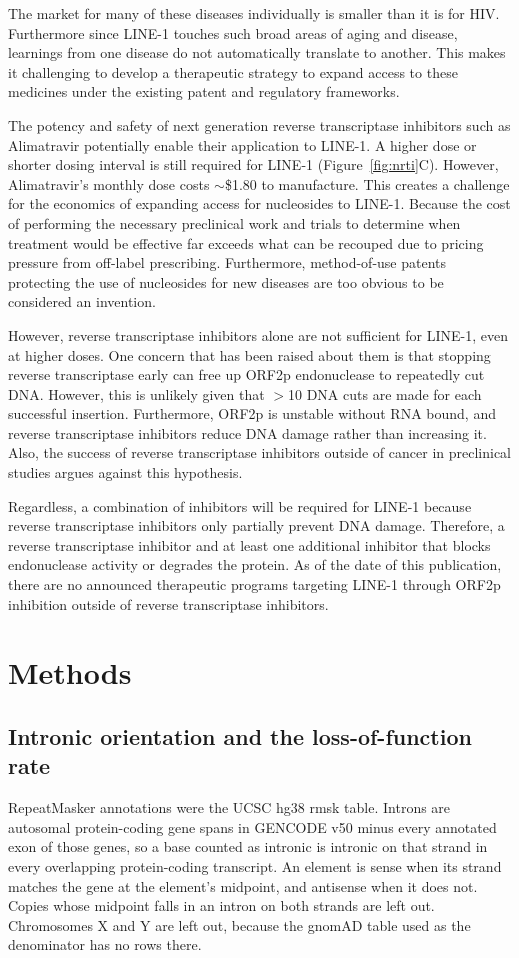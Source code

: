 \documentclass[11pt,twocolumn,twoside]{extarticle}
\begin{document}
The market for many of these diseases individually is smaller than it is for HIV. Furthermore since LINE-1 touches such broad areas of aging and disease, learnings from one disease do not automatically translate to another. This makes it challenging to develop a therapeutic strategy to expand access to these medicines under the existing patent and regulatory frameworks.

The potency and safety of next generation reverse transcriptase inhibitors such as Alimatravir potentially enable their application to LINE-1. A higher dose or shorter dosing interval is still required for LINE-1 (Figure~\ref{fig:nrti}C). However, Alimatravir's monthly dose costs $\sim$\$1.80 to manufacture. This creates a challenge for the economics of expanding access for nucleosides to LINE-1. Because the cost of performing the necessary preclinical work and trials to determine when treatment would be effective far exceeds what can be recouped due to pricing pressure from off-label prescribing. Furthermore, method-of-use patents protecting the use of nucleosides for new diseases are too obvious to be considered an invention.

However, reverse transcriptase inhibitors alone are not sufficient for LINE-1, even at higher doses. One concern that has been raised about them is that stopping reverse transcriptase early can free up ORF2p endonuclease to repeatedly cut DNA\cite{rajurkar}. However, this is unlikely given that $>$10 DNA cuts are made for each successful insertion\cite{gasior}. Furthermore, ORF2p is unstable without RNA bound\cite{baldwin}, and reverse transcriptase inhibitors reduce DNA damage rather than increasing it\cite{dordine}. Also, the success of reverse transcriptase inhibitors outside of cancer in preclinical studies argues against this hypothesis.

Regardless, a combination of inhibitors will be required for LINE-1 because reverse transcriptase inhibitors only partially prevent DNA damage\cite{dordine}. Therefore, a reverse transcriptase inhibitor and at least one additional inhibitor that blocks endonuclease activity or degrades the protein. As of the date of this publication, there are no announced therapeutic programs targeting LINE-1 through ORF2p inhibition outside of reverse transcriptase inhibitors.

\section{Methods}
\subsection{Intronic orientation and the loss-of-function rate}
RepeatMasker annotations were the UCSC hg38 rmsk table. Introns are autosomal protein-coding gene spans in GENCODE v50 minus every annotated exon of those genes, so a base counted as intronic is intronic on that strand in every overlapping protein-coding transcript. An element is sense when its strand matches the gene at the element's midpoint, and antisense when it does not. Copies whose midpoint falls in an intron on both strands are left out. Chromosomes X and Y are left out, because the gnomAD table used as the denominator has no rows there.
\end{document}
